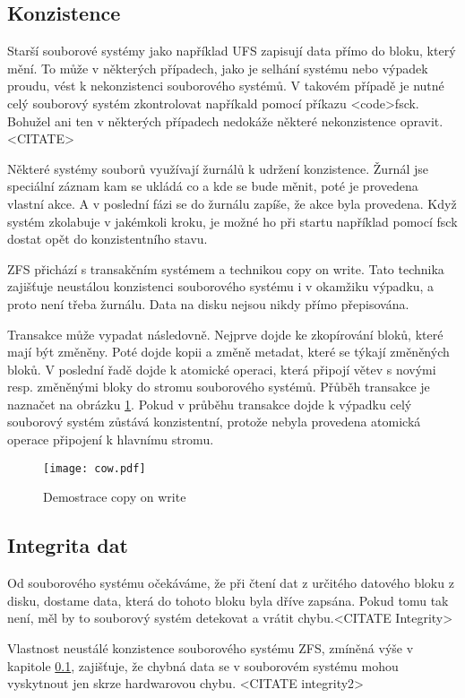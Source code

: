     \subsection{Konzistence}
    \label{consitence}
    Starší souborové systémy jako například UFS zapisují data přímo do bloku, který mění. To může v některých případech, jako je selhání systému nebo výpadek proudu, vést k nekonzistenci souborového systémů. V takovém případě je nutné celý souborový systém zkontrolovat napříkald pomocí příkazu <code>fsck. Bohužel ani ten v některých případech
    nedokáže některé nekonzistence opravit. <CITATE>

    Některé systémy souborů využívají žurnálů k udržení konzistence. Žurnál jse speciální záznam kam se ukládá co a kde se bude měnit, poté
    je provedena vlastní akce. A v poslední fázi se do žurnálu zapíše, že akce byla provedena. Když systém zkolabuje v jakémkoli kroku, je možné ho při startu například pomocí
    fsck dostat opět do konzistentního stavu.

    ZFS přichází s transakčním systémem a technikou copy on write. Tato technika zajišťuje neustálou konzistenci souborového systému i v okamžiku výpadku, a proto není třeba žurnálu. Data na disku nejsou nikdy přímo přepisována.

    Transakce může vypadat následovně. Nejprve dojde ke zkopírování bloků, které mají být změněny. Poté dojde kopii a změně metadat, které se týkají změněných bloků. V poslední
    řadě dojde k atomické operaci, která připojí větev s novými resp. změněnými bloky do stromu souborového systémů. Přůběh transakce je naznačet na obrázku \ref{cow}. Pokud v průběhu transakce dojde k výpadku celý souborový systém zůstává konzistentní, protože nebyla provedena atomická operace připojení k hlavnímu stromu.
    \begin{figure}[h]
        \caption{Demostrace copy on write}
        \label{cow}
        \texttt{[image: cow.pdf]}
    \end{figure}
    \subsection{Integrita dat}
    \label{checksum}
    Od souborového systému očekáváme, že při čtení dat z určitého datového bloku z disku, dostame data, která do tohoto bloku byla dříve zapsána. Pokud tomu tak není, měl by to souborový systém detekovat a vrátit chybu.<CITATE Integrity>
    
    Vlastnost neustálé konzistence souborového systému ZFS, zmíněná výše v kapitole \ref{consitence}, zajišťuje, že chybná data se v souborovém systému mohou vyskytnout jen skrze hardwarovou chybu. <CITATE integrity2> 
    
